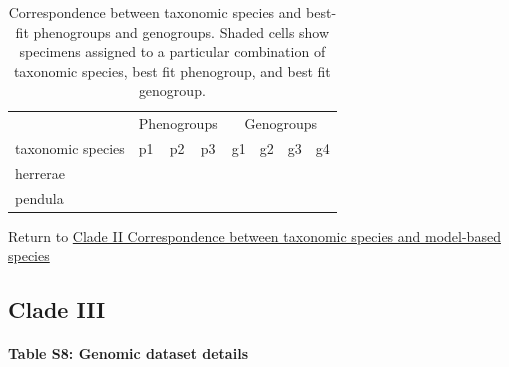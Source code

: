 \documentclass[
  11pt,
]{article}
\begin{document}
\begin{table}[H]

\caption{\label{tab:cladeIIfinalSummary}Correspondence between taxonomic species and best-fit phenogroups and genogroups. Shaded cells show specimens assigned to a particular combination of taxonomic species, best fit phenogroup, and best fit genogroup.}
\centering
\fontsize{8}{10}\selectfont
\begin{tabular}[t]{>{}l|>{}l|>{}l|>{}l||>{}l|>{}l|>{}l|>{}l|}
\toprule
\multicolumn{1}{c}{} & \multicolumn{3}{c}{Phenogroups} & \multicolumn{4}{c}{Genogroups} \\
\cmidrule(l{3pt}r{3pt}){2-4} \cmidrule(l{3pt}r{3pt}){5-8}
taxonomic species & p1 & p2 & p3 & g1 & g2 & g3 & g4\\
\midrule
herrerae & \cellcolor[HTML]{BBBBBB}{\textcolor[HTML]{BBBBBB}{1}} & \cellcolor[HTML]{FFFFFF}{\textcolor[HTML]{FFFFFF}{0}} & \cellcolor[HTML]{FFFFFF}{\textcolor[HTML]{FFFFFF}{0}} & \cellcolor[HTML]{BBBBBB}{\textcolor[HTML]{BBBBBB}{1}} & \cellcolor[HTML]{FFFFFF}{\textcolor[HTML]{FFFFFF}{0}} & \cellcolor[HTML]{FFFFFF}{\textcolor[HTML]{FFFFFF}{0}} & \cellcolor[HTML]{FFFFFF}{\textcolor[HTML]{FFFFFF}{0}}\\
\midrule
pendula & \cellcolor[HTML]{BBBBBB}{\textcolor[HTML]{BBBBBB}{1}} & \cellcolor[HTML]{BBBBBB}{\textcolor[HTML]{BBBBBB}{1}} & \cellcolor[HTML]{BBBBBB}{\textcolor[HTML]{BBBBBB}{1}} & \cellcolor[HTML]{FFFFFF}{\textcolor[HTML]{FFFFFF}{0}} & \cellcolor[HTML]{BBBBBB}{\textcolor[HTML]{BBBBBB}{1}} & \cellcolor[HTML]{BBBBBB}{\textcolor[HTML]{BBBBBB}{1}} & \cellcolor[HTML]{BBBBBB}{\textcolor[HTML]{BBBBBB}{1}}\\
\bottomrule
\end{tabular}
\end{table}

Return to \protect\hyperlink{correspondence-between-taxonomic-species-and-model-based-species-1}{Clade II Correspondence between taxonomic species and model-based species}
\pagebreak

\hypertarget{clade-iii-1}{%
\subsection{Clade III}\label{clade-iii-1}}

\hypertarget{table-s8-genomic-dataset-details}{%
\paragraph{Table S8: Genomic dataset details}\label{table-s8-genomic-dataset-details}}
\end{document}
